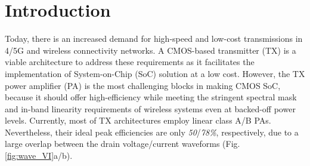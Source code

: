 \documentclass[conference]{IEEEtran}
\begin{document}
\section{Introduction}
Today, there is an increased demand for high-speed and low-cost transmissions in 4/5G and wireless connectivity networks. A CMOS-based transmitter (TX) is a viable architecture to address these requirements as it facilitates the implementation of System-on-Chip (SoC) solution at a low cost. However, the TX power amplifier (PA) is the most challenging blocks in making CMOS SoC, because it should offer high-efficiency while meeting the stringent spectral mask  and in-band linearity requirements of wireless systems even at backed-off power levels. Currently, most of TX architectures employ linear class A/B PAs. Nevertheless, their ideal  peak efficiencies are only \textit{50}/\textit{78\%}, respectively, due to a large overlap between the drain voltage/current  waveforms (Fig.\ref{fig:wave_VI}a/b).
\end{document}

